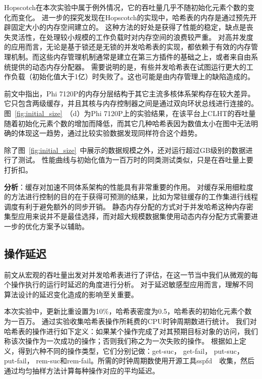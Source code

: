 Hopscotch在本次实验中属于例外情况，它的吞吐量几乎不随初始化元素个数的变化而变化。
进一步的探究发现在Hopscotch的实现中，哈希表的内存是通过预先开辟固定大小的内存空间建立的。
这种方法的好处是获得了性能的稳定，缺点是丧失灵活性，在处理较小规模的工作负载时对内存空间的浪费较严重。
对高并发度的应用而言，无论是基于锁还是无锁的并发哈希表的实现，都依赖于有效的内存管理机制。而这些内存管理机制通常是建立在第三方插件的基础之上，或者来自由系统提供的动态内存分配器。
需要说明的是，有些并发哈希表在试图运行更大的工作负载（初始化值大于1亿）时失败了。这也可能是由内存管理上的缺陷造成的。

前文中指出，Phi 7120P的内存分层结构于其它主流多核体系架构存在较大差异。
它只包含两级缓存，并且其核与内存控制器之间是通过双向环状总线进行连接的。图~\ref{fig:initial_size}~（d）为Phi 7120P上的实验结果，在该平台上CLHT的吞吐量随着初始化元素个数的增加而降低，而其它几种哈希表因为数值太小在图中无法明确的体现这一趋势，通过比较实验数据发现同样符合这个趋势。

除了图~\ref{fig:initial_size}~中展示的数据规模之外，还对运行超过GB级别的数据进行了测试。
性能曲线与初始化值为一百万时的同类测试类似，只是在吞吐量上要打折扣。

\textbf{分析}：缓存对加速不同体系架构的性能具有非常重要的作用。
对缓存采用细粒度的方法进行控制的目的在于获得可预测的结果，比如为常驻缓存的工作集进行线程调度有利于避免额外的同步开销。
静态内存分配的方式对于并发哈希这种内存密集型应用来说并不是最佳选择，而对超大规模数据集使用动态内存分配方式需要进一步的优化方案予以辅助。

\subsection{操作延迟}
\label{sec:latency}
前文从宏观的吞吐量出发对并发哈希表进行了评估，在这一节当中我们从微观的每个操作执行的运行时延迟的角度进行分析。
对于延迟敏感型应用而言，理解不同算法设计的延迟变化造成的影响至关重要。

本次实验中，更新比重设置为10\%，哈希表密度为0.5，哈希表的初始化元素个数为一百万。
通过实验收集哈希表操作所耗费的CPU时钟周期数进行统计。
我们对哈希表的操作进行如下定义：如果某个操作完成了对其预期目标对象的访问，我们称该次操作为一次成功的操作；否则我们称之为一次失败的操作。
根据如上定义，得到六种不同的操作类型，它们分别记做：get-suc， get-fail， put-suc， put-fail， rem-suc和rem-fail。所需的时钟周期数使用开源工具sspfd~\cite{sspfd}~收集，然后通过均匀抽样方法计算每种操作对应的平均延迟。

